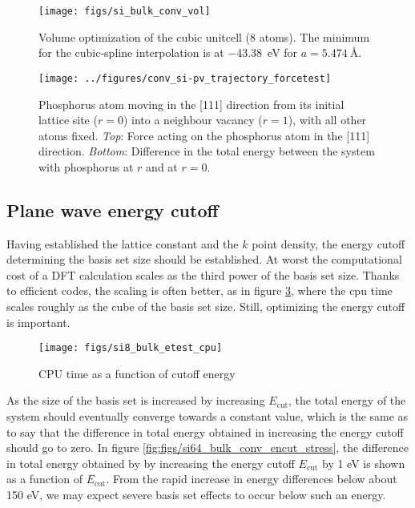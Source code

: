 \documentclass[11pt,bibliography=totoc,index=totoc]{scrbook}   %
\begin{document}
\begin{figure}[htbp]
  \begin{center}
    \texttt{[image: figs/si\_bulk\_conv\_vol]}
  \end{center}
  \caption{
     Volume optimization of the cubic unitcell (8 atoms). 
     The minimum for the cubic-spline interpolation is at
     \SI{-43.38}{\electronvolt} for $a=\SI{5.474}{\angstrom}$.
  }
  \label{fig:si_bulk_conv_vol}
\end{figure}



\begin{figure}[htbp]
  \begin{center}
    \texttt{[image: ../figures/conv\_si-pv\_trajectory\_forcetest]}
  \end{center}
  \caption{Phosphorus atom moving in the [111] direction from its initial lattice site ($r=0$) into a neighbour vacancy ($r=1$),
    with all other atoms fixed.
    \textit{Top}: Force acting on the phosphorus atom in the [111] direction. 
    \textit{Bottom}: Difference in the total energy between the system with phosphorus at $r$ and at $r=0$.
    }
  \label{fig:conv_si-pv_trajectory_forcetest}
\end{figure}

\subsection{Plane wave energy cutoff}

Having established the lattice constant and the $k$ point density, the energy cutoff determining the basis set size
should be established.
At worst the computational cost of a DFT calculation scales as the third power of the basis set size. 
Thanks to efficient codes, the scaling is often better, as in figure \ref{fig:si_bulk_conv_e_cpu}, where the 
cpu time scales roughly as the cube of the basis set size. Still, optimizing the energy cutoff is important.

\begin{figure}[htbp]
  \begin{center}
    \texttt{[image: figs/si8\_bulk\_etest\_cpu]}
  \end{center}
  \caption{CPU time as a function of cutoff energy}
  \label{fig:si_bulk_conv_e_cpu}
\end{figure}

As the size of the basis set is increased by increasing $E_{\text{cut}}$,
the total energy of the system should eventually converge towards a constant value, 
which is the same as to say that the difference in total energy obtained in increasing the energy cutoff should go to zero.
In figure \ref{fig:figs/si64_bulk_conv_encut_stress}, the difference 
in total energy obtained by by increasing the energy cutoff $E_{\text{cut}}$ by 1 eV is shown as a function of $E_{\text{cut}}$.
From the rapid increase in energy differences below about 150 eV, we may expect severe basis set effects to occur below such an energy.
\end{document}
